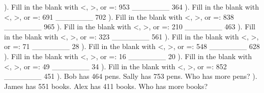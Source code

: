 \documentclass{article}%
\begin{document}
\newline%
). Fill in the blank with <, >, or =: 953 \_\_\_\_\_\_\_ 364%
\newline%
\newline%
). Fill in the blank with <, >, or =: 691 \_\_\_\_\_\_\_ 702%
\newline%
\newline%
). Fill in the blank with <, >, or =: 838 \_\_\_\_\_\_\_ 965%
\newline%
\newline%
). Fill in the blank with <, >, or =: 210 \_\_\_\_\_\_\_ 463%
\newline%
\newline%
). Fill in the blank with <, >, or =: 323 \_\_\_\_\_\_\_ 561%
\newline%
\newline%
). Fill in the blank with <, >, or =: 71 \_\_\_\_\_\_\_ 28%
\newline%
\newline%
). Fill in the blank with <, >, or =: 548 \_\_\_\_\_\_\_ 628%
\newline%
\newline%
). Fill in the blank with <, >, or =: 16 \_\_\_\_\_\_\_ 20%
\newline%
\newline%
). Fill in the blank with <, >, or =: 49 \_\_\_\_\_\_\_ 34%
\newline%
\newline%
). Fill in the blank with <, >, or =: 852 \_\_\_\_\_\_\_ 451%
\newline%
\newline%
). Bob has 464 pens. Sally has 753 pens. Who has more pens?%
\newline%
\newline%
). James has 551 books. Alex has 411 books. Who has more books?%
\newline%
\newline%
\end{document}
